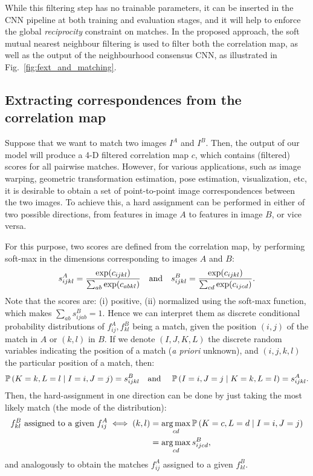 \documentclass{article}
\DeclareMathOperator*{\argmax}{arg\,max}
\begin{document}
While this filtering step has no trainable parameters, it can be inserted in the CNN pipeline at both training and evaluation stages, and it will help to enforce the global \emph{reciprocity} constraint on matches. In the proposed approach, the soft mutual nearest neighbour filtering is used to filter both the correlation map, as well as the output of the neighbourhood consensus CNN, as illustrated in Fig.~\ref{fig:fext_and_matching}.  

\subsection{Extracting correspondences from the correlation map \label{sec:match_assignment}}
Suppose that we want to match two images $I^A$ and $I^B$. Then, the output of our model will produce a 4-D filtered correlation map $c$, which contains (filtered) scores for all pairwise matches. However, for various applications, such as image warping, geometric transformation estimation, pose estimation, visualization, etc, it is desirable to obtain a set of point-to-point image correspondences between the two images. 
To achieve this, a hard assignment can be performed in either of two possible directions, from features in image $A$ to features in image $B$, or vice versa.

For this purpose, two scores are defined from the correlation map, by performing soft-max in the dimensions corresponding to images $A$ and $B$:
\begin{equation}
    s^{A}_{ijkl}=\frac{\exp(c_{ijkl})} 
    {\sum_{ab} \exp(c_{abkl})} 
    \text{\quad and\quad} 
    s^{B}_{ijkl}=\frac{\exp(c_{ijkl})}
    {\sum_{cd} \exp(c_{ijcd})}.
    \label{eq:softmax}
\end{equation}
Note that the scores are: (i) positive, (ii) normalized using the soft-max function, which makes $\sum_{ab} s^{B}_{ijab}=1$. Hence we can interpret them as discrete conditional probability distributions of $f^A_{ij},f^B_{kl}$ being a match, given the position $(i,j)$ of the match in $A$ or $(k,l)$ in $B$. If we denote $(I,J,K,L)$ the discrete random variables indicating the position of a match (\emph{a priori} unknown), and $(i,j,k,l)$ the particular position of a match, then:
\begin{equation}
\mathbb{P}\left(K=k,L=l\mid I=i,J=j\right)=s^B_{ijkl}\text{\quad and \quad}\mathbb{P}\left(I=i,J=j \mid K=k,L=l \right)=s^A_{ijkl}.
\label{eq:prob_dist}
\end{equation}
Then, the hard-assignment in one direction can be done by just taking the most likely match (the mode of the distribution):
\begin{equation}
\begin{split}
     f^B_{kl}\text{\,\,assigned to a given\,\,} f^A_{ij} \iff (k,l)& = 
      \argmax_{cd} \mathbb{P}\left(K=c,L=d\mid I=i,J=j\right) \\
      &= \argmax_{cd} s^B_{ijcd},
     \label{eq:hard_assign}
\end{split}
\end{equation}
and analogously to obtain the matches $f^A_{ij}$ assigned to a given $f^B_{kl}$.
\end{document}
